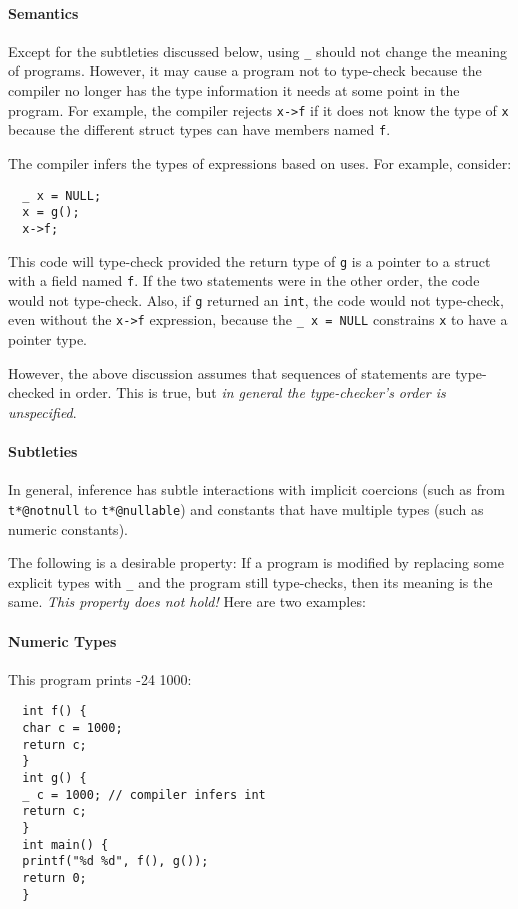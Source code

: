 \paragraph{Semantics}
Except for the subtleties discussed below, using \texttt{_} should not change the
meaning of programs.  However, it may cause a program not to type-check
because the compiler no longer has the type information it needs at some point
in the program.  For example, the compiler rejects \texttt{x->f} if it does not
know the type of \texttt{x} because the different struct types can have
members named \texttt{f}. 

The compiler infers the types of expressions based on uses.  For
example, consider:
\begin{verbatim}
  _ x = NULL;
  x = g();
  x->f;
\end{verbatim}
This code will type-check provided the return type of \texttt{g} is a
pointer to a struct with a field named \texttt{f}.  If the two
statements were in the other order, the code would not type-check. 
Also, if \texttt{g} returned an \texttt{int}, the code would not
type-check, even without the \texttt{x->f} expression, because the
\texttt{_ x = NULL} constrains \texttt{x} to have a pointer type.

However, the above discussion assumes that sequences of statements are
type-checked in order.  This is true, but \emph{in general the
  type-checker's order is unspecified}.

\paragraph{Subtleties}
In general, inference has subtle interactions with implicit coercions
(such as from \texttt{t*@notnull} to \texttt{t*@nullable}) and
constants that have multiple types (such as numeric constants).

The following is a desirable property: If a program is modified by
replacing some explicit types with \texttt{_} and the program still
type-checks, then its meaning is the same.  \emph{This property does
  not hold!}  Here are two examples:

\paragraph{Numeric Types} This program prints -24 1000:
\begin{verbatim}
  int f() {
  char c = 1000;
  return c;
  }
  int g() {
  _ c = 1000; // compiler infers int
  return c;
  }
  int main() {
  printf("%d %d", f(), g());
  return 0;
  }
\end{verbatim}

